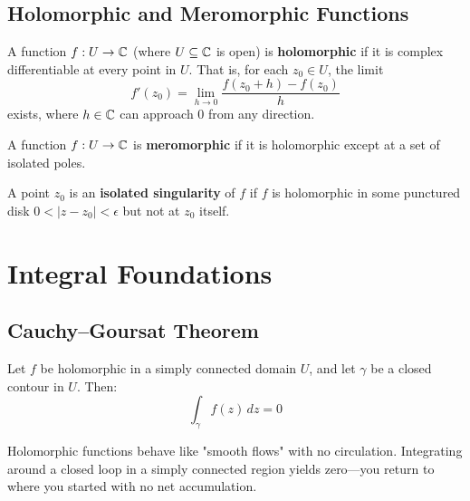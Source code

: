 \subsection{Holomorphic and Meromorphic Functions}

\begin{definition}
A function $f: U \to \mathbb{C}$ (where $U \subseteq \mathbb{C}$ is open) is \textbf{holomorphic} if it is complex differentiable at every point in $U$. That is, for each $z_0 \in U$, the limit
\begin{equation}
f'(z_0) = \lim_{h \to 0} \frac{f(z_0 + h) - f(z_0)}{h}
\end{equation}
exists, where $h \in \mathbb{C}$ can approach $0$ from any direction.
\end{definition}

\begin{definition}
A function $f: U \to \mathbb{C}$ is \textbf{meromorphic} if it is holomorphic except at a set of isolated poles.
\end{definition}

\begin{definition}
A point $z_0$ is an \textbf{isolated singularity} of $f$ if $f$ is holomorphic in some punctured disk $0 < |z - z_0| < \epsilon$ but not at $z_0$ itself.
\end{definition}

\section{Integral Foundations}
\label{sec:integral-foundations}

\subsection{Cauchy–Goursat Theorem}

\begin{theorem}\label{thm:cauchy-goursat}
Let $f$ be holomorphic in a simply connected domain $U$, and let $\gamma$ be a closed contour in $U$. Then:
\begin{equation}
\int_{\gamma} f(z) \, dz = 0
\end{equation}
\end{theorem}

\begin{intuitive}
Holomorphic functions behave like "smooth flows" with no circulation. Integrating around a closed loop in a simply connected region yields zero—you return to where you started with no net accumulation.
\end{intuitive}


